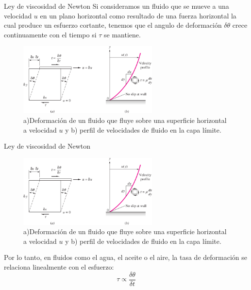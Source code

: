 \documentclass [xcolor=svgnames, t] {beamer}
\begin{document}
\begin{frame}{Ley de viscosidad de Newton}
Si consideramos un fluido que se mueve a una velocidad $u$ en un plano horizontal como resultado de una fuerza horizontal la cual produce un esfuerzo cortante, tenemos que el angulo de deformaci\'on $\delta \theta$ crece continuamente con el tiempo si $\tau$ se mantiene.

\begin{figure}[h]
\centering
\includegraphics[width=7cm]{visco}
\caption{a)Deformaci\'on de un fluido que fluye sobre una superficie horizontal a velocidad $u$ y  b) perfil de velocidades de fluido en la capa l\'imite.}
\end{figure}

\end{frame}

\begin{frame}{Ley de viscosidad de Newton}
\vspace{-0.4cm}
\begin{figure}[h]
\centering
\includegraphics[width=7cm]{visco}
\caption{a)Deformaci\'on de un fluido que fluye sobre una superficie horizontal a velocidad $u$ y  b) perfil de velocidades de fluido en la capa l\'imite.}
\end{figure}

Por lo tanto, en fluidos como el agua, el aceite o el aire, la tasa de deformaci\'on se relaciona linealmente con el esfuerzo:
\begin{equation}
\tau \propto \frac{\delta \theta}{\delta t}
\label{vis1}
\end{equation}
\end{frame}
\end{document}
